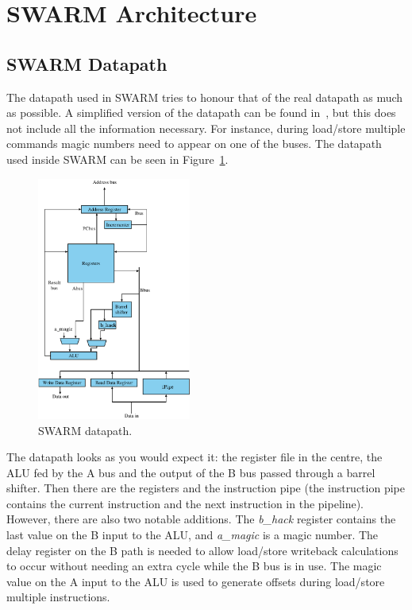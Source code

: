 \documentclass[10pt,a4paper]{article}
\begin{document}
\section{SWARM Architecture} %
\label{swarmarch}            %

\subsection{SWARM Datapath} %
\label{sec:datapath}        %

The datapath used in SWARM tries to honour that of the real datapath
as much as possible. A simplified version of the datapath can be found
in~\cite{furber:arm96}, but this does not include all the information
necessary. For instance, during load/store multiple commands magic
numbers need to appear on one of the buses. The datapath used inside
SWARM can be seen in Figure~\ref{fig:datapath}.

\begin{figure}
\centering
\mbox{\includegraphics[height=8cm]{pics/arm6blk}}
\caption{SWARM datapath.}
\label{fig:datapath}
\end{figure}

The datapath looks as you would expect it: the register file in the
centre, the ALU fed by the A bus and the output of the B bus passed
through a barrel shifter. Then there are the registers and the
instruction pipe (the instruction pipe contains the current
instruction and the next instruction in the pipeline). However, there
are also two notable additions. The \emph{b\_hack} register contains
the last value on the B input to the ALU, and \emph{a\_magic} is a
magic number. The delay register on the B path is needed to allow
load/store writeback calculations to occur without needing an extra
cycle while the B bus is in use. The magic value on the A input to the
ALU is used to generate offsets during load/store multiple
instructions.
\end{document}
